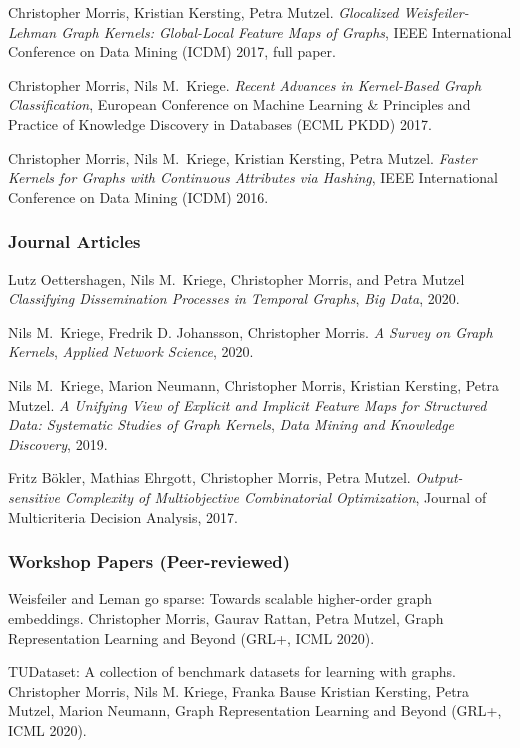 \documentclass[11pt, a4paper]{scrartcl}
\begin{document}
\begin{thebibliography}{5}
    Christopher Morris, Kristian Kersting, Petra Mutzel.
	\emph{Glocalized Weisfeiler-Lehman Graph Kernels: Global-Local Feature Maps of Graphs},
	IEEE International Conference on Data Mining (ICDM) 2017, full paper.
	
	Christopher Morris, Nils M.~Kriege.
	\emph{Recent Advances in Kernel-Based Graph Classification},
	European Conference on Machine Learning \& Principles and Practice of Knowledge Discovery in Databases (ECML PKDD) 2017.
	
    Christopher Morris, Nils M.~Kriege, Kristian Kersting, Petra Mutzel.
	\emph{Faster Kernels for Graphs with Continuous Attributes via Hashing},
	IEEE International Conference on Data Mining (ICDM) 2016.
	
\subsubsection*{Journal Articles}

Lutz Oettershagen, Nils M.~Kriege, Christopher Morris, and Petra Mutzel
\emph{Classifying Dissemination Processes in Temporal Graphs},
\emph{Big Data}, 2020.

Nils M.~Kriege,  Fredrik D. Johansson, Christopher Morris.
\emph{A Survey on Graph Kernels},
\emph{Applied Network Science}, 2020.

Nils M.~Kriege,  Marion Neumann, Christopher Morris, Kristian Kersting, Petra Mutzel.
\emph{A Unifying View of Explicit and Implicit Feature Maps for Structured Data: Systematic Studies of Graph Kernels},
\emph{Data Mining and Knowledge Discovery}, 2019.

Fritz B\"okler, Mathias Ehrgott, Christopher Morris, Petra Mutzel.
\emph{Output-sensitive Complexity of Multiobjective Combinatorial Optimization},
Journal of Multicriteria Decision Analysis, 2017.

\subsubsection*{Workshop Papers (Peer-reviewed)}

Weisfeiler and Leman go sparse: Towards scalable higher-order graph embeddings.
Christopher Morris, Gaurav Rattan, Petra Mutzel,
Graph Representation Learning and Beyond (GRL+, ICML 2020).

TUDataset: A collection of benchmark datasets for learning with graphs.
Christopher Morris, Nils M. Kriege, Franka Bause Kristian Kersting, Petra Mutzel, Marion Neumann,
Graph Representation Learning and Beyond (GRL+, ICML 2020).


\end{thebibliography}
\end{document}
